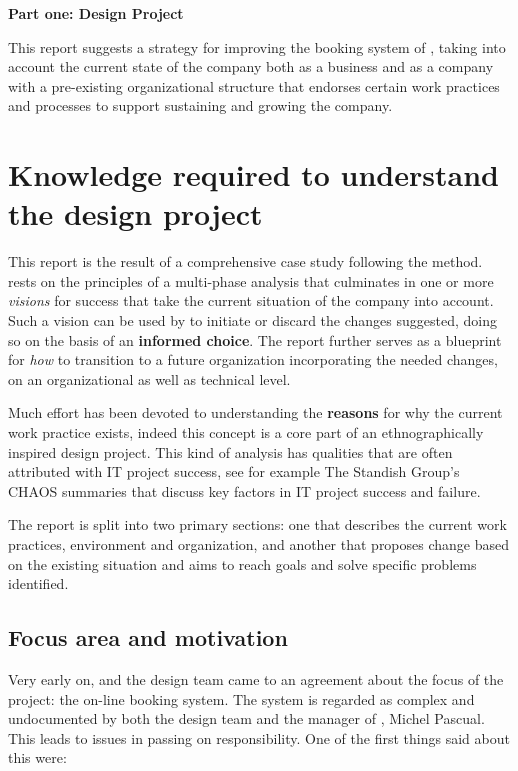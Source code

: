 \textbf{\LARGE{Part one: Design Project}}

This report suggests a strategy for improving the booking system
of \gomonkey{}, taking into account the current state of the company both as a
business and as a company with a pre-existing organizational
structure that endorses certain work practices and processes to support
sustaining and growing the company.

\section{Knowledge required to understand the design project}
This report is the result of a comprehensive case study following the \must{ } method. 
\must{ } rests on the principles of a multi-phase analysis that
culminates in one or more \textit{visions} for success that take the current
situation of the company into account. Such a vision can be used by \gomonkey{}
to initiate or discard the changes suggested, doing so on the basis of an
\textbf{informed choice}. The report further serves as a blueprint for
\textit{how} to transition to a future organization incorporating the needed
changes, on an organizational as well as technical level.

Much effort has been devoted to understanding the \textbf{reasons} for why the
current work practice exists, indeed this concept is a core part of an
ethnographically inspired design project. This kind of analysis has qualities
that are often attributed with IT project success, see for example The Standish
Group's CHAOS summaries that discuss key factors in IT project success and
failure.

The report is split into two primary sections: one that describes the current
work practices, environment and organization, and another that proposes change
based on the existing situation and aims to reach goals and solve specific
problems identified.

\subsection{Focus area and motivation}
Very early on, \gomonkey{} and the design team came to an agreement about the
focus of the project: the on-line booking system. The system is regarded as
complex and undocumented by both the design team and the manager of \gomonkey{}, 
Michel Pascual. This leads to issues in passing on responsibility. One of the
first things said about this were:

